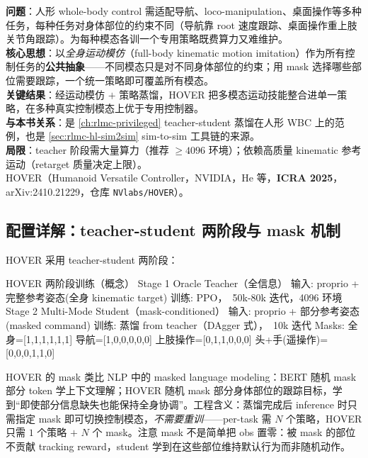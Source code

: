 \begin{paper}\label{paper:rlmc-hl-hover}
\textbf{问题}：人形 whole-body control 需适配导航、loco-manipulation、桌面操作等多种任务，每种任务对身体部位的约束不同（导航靠 root 速度跟踪、桌面操作重上肢关节角跟踪）。为每种模态各训一个专用策略既费算力又难维护。\\
\textbf{核心思想}：以\emph{全身运动模仿}（full-body kinematic motion imitation）作为所有控制任务的\textbf{公共抽象}——不同模态只是对不同身体部位的约束；用 mask 选择哪些部位需要跟踪，一个统一策略即可覆盖所有模态。\\
\textbf{关键结果}：经运动模仿 $+$ 策略蒸馏，HOVER 把多模态运动技能整合进单一策略，在多种真实控制模态上优于专用控制器。\\
\textbf{与本书关系}：是 \cref{ch:rlmc-privileged} teacher-student 蒸馏在人形 WBC 上的范例，也是 \cref{sec:rlmc-hl-sim2sim} sim-to-sim 工具链的来源。\\
\textbf{局限}：teacher 阶段需大量算力（推荐 $\geq 4096$ 环境）；依赖高质量 kinematic 参考运动（retarget 质量决定上限）。\\
HOVER（Humanoid Versatile Controller，NVIDIA，He 等，\textbf{ICRA 2025}，arXiv:2410.21229，仓库 \texttt{NVlabs/\allowbreak HOVER}）\cite{he2025hover}。
\end{paper}

\subsection{配置详解：teacher-student 两阶段与 mask 机制}
HOVER 采用 teacher-student 两阶段：

\begin{codebox}[text]{HOVER 两阶段训练（概念）}
Stage 1  Oracle Teacher（全信息）
  输入: proprio + 完整参考姿态(全身 kinematic target)
  训练: PPO，~50k-80k 迭代，4096 环境
Stage 2  Multi-Mode Student（mask-conditioned）
  输入: proprio + 部分参考姿态(masked command)
  训练: 蒸馏 from teacher（DAgger 式），~10k 迭代
  Masks: 全身=[1,1,1,1,1,1] 导航=[1,0,0,0,0,0]
         上肢操作=[0,1,1,0,0,0] 头+手(遥操作)=[0,0,0,1,1,0]
\end{codebox}

\begin{insight}\label{ins:rlmc-hl-mask}
HOVER 的 mask 类比 NLP 中的 masked language modeling：BERT 随机 mask 部分 token 学上下文理解；HOVER 随机 mask 部分身体部位的跟踪目标，学到“即使部分信息缺失也能保持全身协调”。工程含义：蒸馏完成后 inference 时只需指定 mask 即可切换控制模态，\emph{不需要重训}——per-task 需 $N$ 个策略，HOVER 只需 $1$ 个策略 $+$ $N$ 个 mask。注意 mask 不是简单把 obs 置零：被 mask 的部位不贡献 tracking reward，student 学到在这些部位维持默认行为而非随机动作。
\end{insight}

